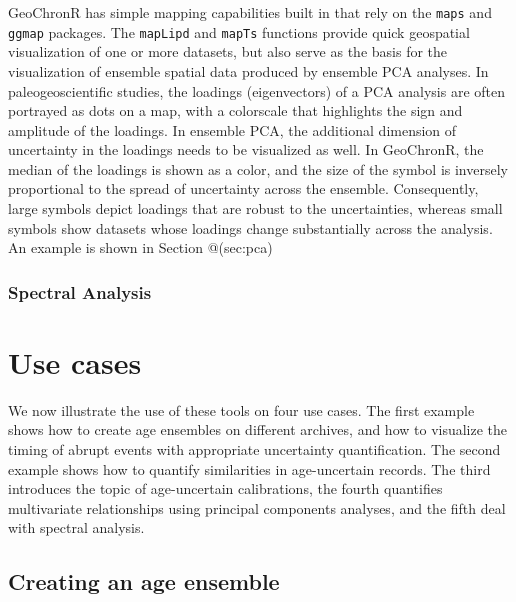 \documentclass[gc, manuscript]{copernicus}
\begin{document}
GeoChronR has simple mapping capabilities built in that rely on the \texttt{maps} \citep{maps} and \texttt{ggmap} \citep{ggmap} packages.
The \texttt{mapLipd} and \texttt{mapTs} functions provide quick geospatial visualization of one or more datasets, but also serve as the basis for the visualization of ensemble spatial data produced by ensemble PCA analyses.
In paleogeoscientific studies, the loadings (eigenvectors) of a PCA analysis are often portrayed as dots on a map, with a colorscale that highlights the sign and amplitude of the loadings.
In ensemble PCA, the additional dimension of uncertainty in the loadings needs to be visualized as well.
In GeoChronR, the median of the loadings is shown as a color, and the size of the symbol is inversely proportional to the spread of uncertainty across the ensemble.
Consequently, large symbols depict loadings that are robust to the uncertainties, whereas small symbols show datasets whose loadings change substantially across the analysis.
An example is shown in Section @(sec:pca)

\subsubsection{Spectral Analysis}

\hypertarget{sec:use-cases}{%
\section{Use cases}\label{sec:use-cases}}

We now illustrate the use of these tools on four use cases. The first example shows how to create age ensembles on different archives, and how to visualize the timing of abrupt events with appropriate uncertainty quantification. The second example shows how to quantify similarities in age-uncertain records. The third introduces the topic of age-uncertain calibrations, the fourth quantifies multivariate relationships using principal components analyses, and the fifth deal with spectral analysis.

\subsection{Creating an age ensemble}
\end{document}
